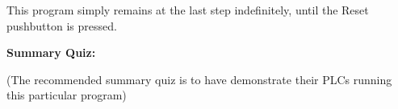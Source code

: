 This program simply remains at the last step indefinitely, until the Reset pushbutton is pressed.






\vfil \eject

\noindent
{\bf Summary Quiz:}

(The recommended summary quiz is to have  demonstrate their PLCs running this particular program)




